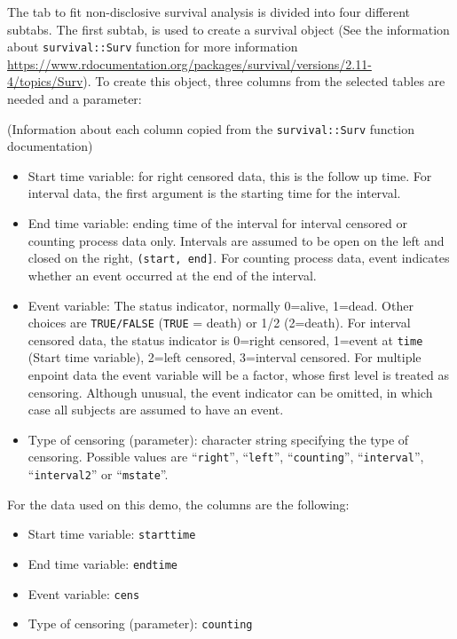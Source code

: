 \documentclass[
]{book}
\providecommand{\tightlist}{%
  \setlength{\itemsep}{0pt}\setlength{\parskip}{0pt}}
\begin{document}
The tab to fit non-disclosive survival analysis is divided into four different subtabs. The first subtab, is used to create a survival object (See the information about \texttt{survival::Surv} function for more information \url{https://www.rdocumentation.org/packages/survival/versions/2.11-4/topics/Surv}). To create this object, three columns from the selected tables are needed and a parameter:

(Information about each column copied from the \texttt{survival::Surv} function documentation)

\begin{itemize}
\tightlist
\item
  Start time variable: for right censored data, this is the follow up time. For interval data, the first argument is the starting time for the interval.
\item
  End time variable: ending time of the interval for interval censored or counting process data only. Intervals are assumed to be open on the left and closed on the right, \texttt{(start,\ end{]}}. For counting process data, event indicates whether an event occurred at the end of the interval.
\item
  Event variable: The status indicator, normally 0=alive, 1=dead. Other choices are \texttt{TRUE/FALSE} (\texttt{TRUE} = death) or 1/2 (2=death). For interval censored data, the status indicator is 0=right censored, 1=event at \texttt{time} (Start time variable), 2=left censored, 3=interval censored. For multiple enpoint data the event variable will be a factor, whose first level is treated as censoring. Although unusual, the event indicator can be omitted, in which case all subjects are assumed to have an event.
\item
  Type of censoring (parameter): character string specifying the type of censoring. Possible values are ``\texttt{right}'', ``\texttt{left}'', ``\texttt{counting}'', ``\texttt{interval}'', ``\texttt{interval2}'' or ``\texttt{mstate}''.
\end{itemize}

For the data used on this demo, the columns are the following:

\begin{itemize}
\tightlist
\item
  Start time variable: \texttt{starttime}
\item
  End time variable: \texttt{endtime}
\item
  Event variable: \texttt{cens}
\item
  Type of censoring (parameter): \texttt{counting}
\end{itemize}
\end{document}
